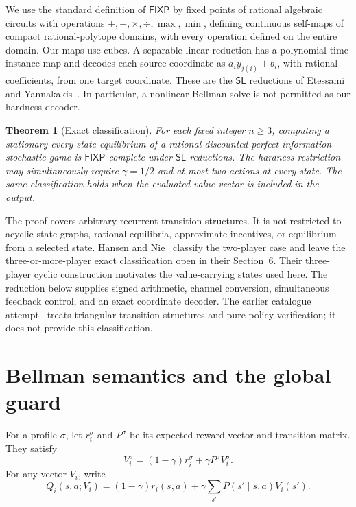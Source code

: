 \documentclass[11pt,a4paper]{article}
\numberwithin{equation}{section}
\newtheorem{theorem}{Theorem}
\theoremstyle{definition}
\newcommand{\FIXP}{\mathsf{FIXP}}
\newcommand{\SL}{\mathsf{SL}}
\begin{document}
We use the standard definition of \(\FIXP\) by fixed points of rational
algebraic circuits with operations \(+, -,\times,\div,\max,\min\),
defining continuous self-maps of compact rational-polytope domains, with
every operation defined on the entire domain. Our maps use cubes.
A separable-linear reduction has
a polynomial-time instance map and decodes each source coordinate as
\(a_i y_{j(i)}+b_i\), with rational coefficients, from one target
coordinate. These are the \(\SL\) reductions of Etessami and
Yannakakis~\cite{EY}. In particular, a nonlinear Bellman solve is not
permitted as our hardness decoder.

\begin{theorem}[Exact classification]\label{thm:main}
For each fixed integer \(n\geq3\), computing a stationary every-state
equilibrium of a rational discounted perfect-information stochastic game
is \(\FIXP\)-complete under \(\SL\) reductions. The hardness restriction
may simultaneously require \(\gamma=1/2\) and at most two actions at every
state. The same classification holds when the evaluated value vector is
included in the output.
\end{theorem}

The proof covers arbitrary recurrent transition structures.
It is not restricted to acyclic state graphs, rational
equilibria, approximate incentives, or equilibrium from a selected state.
Hansen and Nie~\cite{HN} classify the two-player case and leave the
three-or-more-player exact classification open in their Section~6.
Their three-player cyclic construction motivates the value-carrying
states used here. The reduction below supplies signed arithmetic,
channel conversion, simultaneous feedback control, and an exact
coordinate decoder. The earlier catalogue attempt~\cite{prior} treats
triangular transition structures and pure-policy verification; it does
not provide this classification.

\section{Bellman semantics and the global guard}\label{sec:bellman}

For a profile \(\sigma\), let \(r_i^\sigma\) and \(P^\sigma\) be its
expected reward vector and transition matrix. They satisfy
\begin{equation}\label{eq:eval}
 V_i^\sigma=(1-\gamma)r_i^\sigma+\gamma P^\sigma V_i^\sigma.
\end{equation}
For any vector \(V_i\), write
\begin{equation}\label{eq:q}
 Q_i(s,a;V_i)=(1-\gamma)r_i(s,a)
                  +\gamma\sum_{s'}P(s'\mid s,a)V_i(s').
\end{equation}
\end{document}
